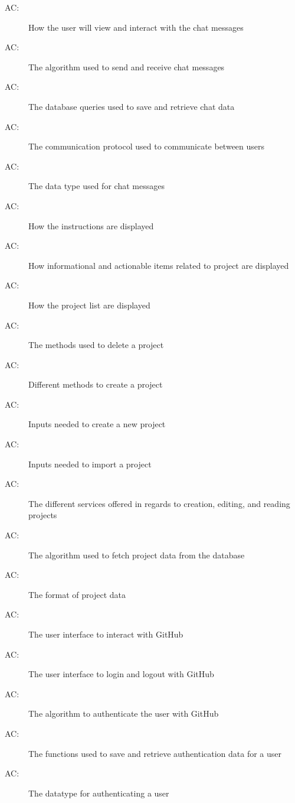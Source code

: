 \documentclass[12pt, titlepage]{article}
\newcounter{acnum}
\newcommand{\actheacnum}{AC\theacnum}
\begin{document}
\begin{description}
		\item[ \actheacnum \label{ac18}:]  How the user will view and interact with the chat messages
		\item[ \actheacnum \label{ac19}:]  The algorithm used to send and receive chat messages
		\item[ \actheacnum \label{ac20}:]  The database queries used to save and retrieve chat data
		\item[ \actheacnum \label{ac21}:]  The communication protocol used to communicate between users
		\item[ \actheacnum \label{ac22}:]  The data type used for chat messages
		\item[ \actheacnum \label{ac23}:]  How the instructions are displayed
		\item[ \actheacnum \label{ac24}:]  How informational and actionable items related to project are displayed
		\item[ \actheacnum \label{ac25}:]  How the project list are displayed
		\item[ \actheacnum \label{ac26}:]  The methods used to delete a project
		\item[ \actheacnum \label{ac27}:]  Different methods to create a project
		\item[ \actheacnum \label{ac28}:]  Inputs needed to create a new project
		\item[ \actheacnum \label{ac29}:]  Inputs needed to import a project
		\item[ \actheacnum \label{ac30}:]  The different services offered in regards to creation, editing, and reading projects
		\item[ \actheacnum \label{ac31}:]  The algorithm used to fetch project data from the database
		\item[ \actheacnum \label{ac32}:]  The format of project data
		\item[ \actheacnum \label{ac33}:]  The user interface to interact with GitHub
		\item[ \actheacnum \label{ac34}:]  The user interface to login and logout with GitHub
		\item[ \actheacnum \label{ac35}:]  The algorithm to authenticate the user with GitHub
		\item[ \actheacnum \label{ac36}:]  The functions used to save and retrieve authentication data for a user
		\item[ \actheacnum \label{ac37}:]  The datatype for authenticating a user
		

\end{description}
\end{document}
